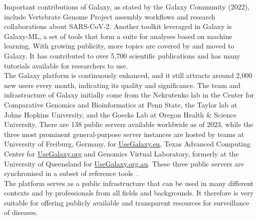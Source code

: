 Important contributions of Galaxy, as stated by the Galaxy Community (2022), include Vertebrate Genome Project assembly workflows and research collaborations about \ac{SARS-CoV-2}. Another toolkit leveraged in Galaxy is Galaxy-ML, a set of tools that form a suite for analyses based on machine learning. With growing publicity, more topics are covered by and moved to Galaxy. It has contributed to over 5,700 scientific publications and has many tutorials available for researchers to use. \\
The Galaxy platform is continuously enhanced, and it still attracts around 2,000 new users every month, indicating its quality and significance. The team and infrastructure of Galaxy initially come from the Nekrutenko lab in the Center for Comparative Genomics and Bioinformatics at Penn State, the Taylor lab at Johns Hopkins University, and the Goecks Lab at Oregon Health \& Science University. There are 138 public servers available worldwide as of 2023, while the three most prominent general-purpose server instances are hosted by teams at University of Freiburg, Germany, for \href{https://usegalaxy.eu/}{UseGalaxy.eu}, Texas Advanced Computing Center for \href{https://usegalaxy.org/}{UseGalaxy.org} and Genomics Virtual Laboratory, formerly at the University of Queensland for \href{https://usegalaxy.org.au/}{UseGalaxy.org.au}. These three public servers are synchronised in a subset of reference tools~\cite{10.1093/nar/gkac247}. \\
The platform serves as a public infrastructure that can be used in many different contexts and by professionals from all fields and backgrounds. It therefore is very suitable for offering publicly available and transparent resources for surveillance of diseases.

